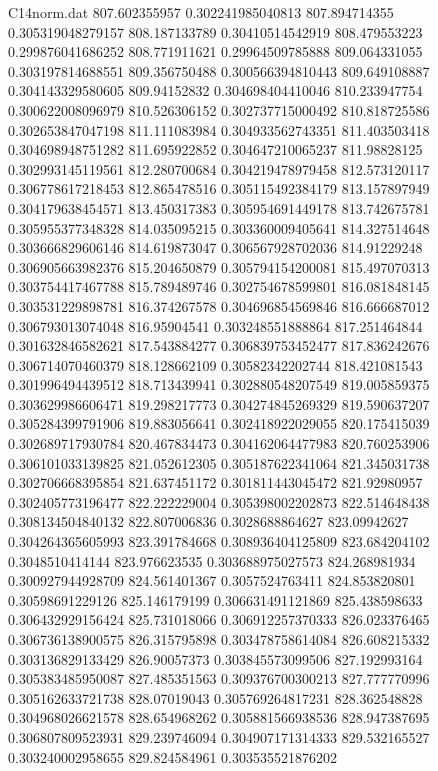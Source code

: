 \begin{filecontents}{C14norm.dat}
807.602355957			0.302241985040813
807.894714355			0.305319048279157
808.187133789			0.30410514542919
808.479553223			0.299876041686252
808.771911621			0.29964509785888
809.064331055			0.303197814688551
809.356750488			0.300566394810443
809.649108887			0.304143329580605
809.94152832			0.304698404410046
810.233947754			0.300622008096979
810.526306152			0.302737715000492
810.818725586			0.302653847047198
811.111083984			0.304933562743351
811.403503418			0.304698948751282
811.695922852			0.304647210065237
811.98828125			0.302993145119561
812.280700684			0.304219478979458
812.573120117			0.306778617218453
812.865478516			0.305115492384179
813.157897949			0.304179638454571
813.450317383			0.305954691449178
813.742675781			0.305955377348328
814.035095215			0.303360009405641
814.327514648			0.303666829606146
814.619873047			0.306567928702036
814.91229248			0.306905663982376
815.204650879			0.305794154200081
815.497070313			0.303754417467788
815.789489746			0.302754678599801
816.081848145			0.303531229898781
816.374267578			0.304696854569846
816.666687012			0.306793013074048
816.95904541			0.303248551888864
817.251464844			0.301632846582621
817.543884277			0.306839753452477
817.836242676			0.306714070460379
818.128662109			0.30582342202744
818.421081543			0.301996494439512
818.713439941			0.302880548207549
819.005859375			0.303629986606471
819.298217773			0.304274845269329
819.590637207			0.305284399791906
819.883056641			0.302418922029055
820.175415039			0.302689717930784
820.467834473			0.304162064477983
820.760253906			0.306101033139825
821.052612305			0.305187622341064
821.345031738			0.302706668395854
821.637451172			0.301811443045472
821.92980957			0.302405773196477
822.222229004			0.305398002202873
822.514648438			0.308134504840132
822.807006836			0.3028688864627
823.09942627			0.304264365605993
823.391784668			0.308936404125809
823.684204102			0.3048510414144
823.976623535			0.303688975027573
824.268981934			0.300927944928709
824.561401367			0.3057524763411
824.853820801			0.30598691229126
825.146179199			0.306631491121869
825.438598633			0.306432929156424
825.731018066			0.306912257370333
826.023376465			0.306736138900575
826.315795898			0.303478758614084
826.608215332			0.303136829133429
826.90057373			0.303845573099506
827.192993164			0.305383485950087
827.485351563			0.309376700300213
827.777770996			0.305162633721738
828.07019043			0.305769264817231
828.362548828			0.304968026621578
828.654968262			0.305881566938536
828.947387695			0.306807809523931
829.239746094			0.304907171314333
829.532165527			0.303240002958655
829.824584961			0.303535521876202

\end{filecontents}
